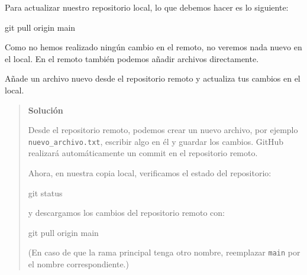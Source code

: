 \documentclass[
  spanish,
  12pt,
  letterpaper,
  DIV=11,
  numbers=noendperiod]{scrreprt}
\newenvironment{Shaded}{\begin{snugshade}}{\end{snugshade}}
\newcommand{\FunctionTok}[1]{\textcolor[rgb]{0.28,0.35,0.67}{#1}}
\newcommand{\NormalTok}[1]{\textcolor[rgb]{0.00,0.23,0.31}{#1}}
\begin{document}
Para actualizar nuestro repositorio local, lo que debemos hacer es lo
siguiente:

\begin{Shaded}
\begin{Highlighting}[]
\FunctionTok{git}\NormalTok{ pull origin main}
\end{Highlighting}
\end{Shaded}

Como no hemos realizado ningún cambio en el remoto, no veremos nada
nuevo en el local. En el remoto también podemos añadir archivos
directamente.

\begin{tcolorbox}[enhanced jigsaw, arc=.35mm, bottomrule=.15mm, bottomtitle=1mm, breakable, colback=white, colbacktitle=quarto-callout-note-color!10!white, colframe=quarto-callout-note-color-frame, coltitle=black, left=2mm, leftrule=.75mm, opacityback=0, opacitybacktitle=0.6, rightrule=.15mm, title=\textcolor{quarto-callout-note-color}{\faInfo}\hspace{0.5em}{Ejercicio}, titlerule=0mm, toprule=.15mm, toptitle=1mm]

Añade un archivo nuevo desde el repositorio remoto y actualiza tus
cambios en el local.

\begin{quote}
\textbf{Solución}

Desde el repositorio remoto, podemos crear un nuevo archivo, por ejemplo
\texttt{nuevo\_archivo.txt}, escribir algo en él y guardar los cambios.
GitHub realizará automáticamente un commit en el repositorio remoto.

Ahora, en nuestra copia local, verificamos el estado del repositorio:

\begin{Shaded}
\begin{Highlighting}[]
\FunctionTok{git}\NormalTok{ status}
\end{Highlighting}
\end{Shaded}

y descargamos los cambios del repositorio remoto con:

\begin{Shaded}
\begin{Highlighting}[]
\FunctionTok{git}\NormalTok{ pull origin main}
\end{Highlighting}
\end{Shaded}

(En caso de que la rama principal tenga otro nombre, reemplazar
\texttt{main} por el nombre correspondiente.)


\end{quote}
\end{tcolorbox}
\end{document}

